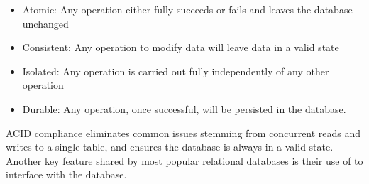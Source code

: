 \begin{itemize}
    \item Atomic: Any operation either fully succeeds or fails and leaves the database unchanged
    \item Consistent: Any operation to modify data will leave data in a valid state
    \item Isolated: Any operation is carried out fully independently of any other operation
    \item Durable: Any operation, once successful, will be persisted in the database.
\end{itemize}

ACID compliance eliminates common issues stemming from concurrent reads and writes to a single table, and ensures the database is always in a valid state. Another key feature shared by most popular relational databases is their use of  to interface with the database.

